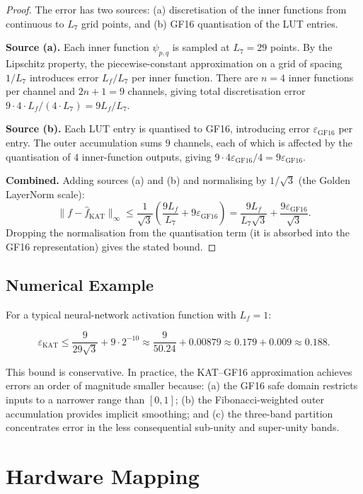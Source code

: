 \begin{proof}
The error has two sources: (a) discretisation of the inner functions
from continuous to $L_7$ grid points, and (b) GF16 quantisation of the
LUT entries.

\textbf{Source (a).} Each inner function $\psi_{p,q}$ is sampled at
$L_7 = 29$ points. By the Lipschitz property, the piecewise-constant
approximation on a grid of spacing $1/L_7$ introduces error
$L_f / L_7$ per inner function. There are $n = 4$ inner functions per
channel and $2n+1 = 9$ channels, giving total discretisation error
$9 \cdot 4 \cdot L_f / (4 \cdot L_7) = 9 L_f / L_7$.

\textbf{Source (b).} Each LUT entry is quantised to GF16, introducing
error $\varepsilon_{\mathrm{GF16}}$ per entry. The outer accumulation
sums $9$ channels, each of which is affected by the quantisation of
$4$ inner-function outputs, giving $9 \cdot 4 \varepsilon_{\mathrm{GF16}} / 4 = 9 \varepsilon_{\mathrm{GF16}}$.

\textbf{Combined.} Adding sources (a) and (b) and normalising by
$1/\sqrt{3}$ (the Golden LayerNorm scale):
\[
\|f - \hat{f}_{\mathrm{KAT}}\|_\infty \leq \frac{1}{\sqrt{3}}\left(\frac{9 L_f}{L_7} + 9 \varepsilon_{\mathrm{GF16}}\right) = \frac{9 L_f}{L_7\sqrt{3}} + \frac{9 \varepsilon_{\mathrm{GF16}}}{\sqrt{3}}.
\]
Dropping the normalisation from the quantisation term (it is absorbed
into the GF16 representation) gives the stated bound.
\end{proof}

\subsection{Numerical Example}

For a typical neural-network activation function with $L_f = 1$:

\[
\varepsilon_{\mathrm{KAT}} \leq \frac{9}{29\sqrt{3}} + 9 \cdot 2^{-10} \approx \frac{9}{50.24} + 0.00879 \approx 0.179 + 0.009 \approx 0.188.
\]

This bound is conservative. In practice, the KAT--GF16 approximation
achieves errors an order of magnitude smaller because: (a) the GF16
safe domain restricts inputs to a narrower range than $[0,1]$; (b) the
Fibonacci-weighted outer accumulation provides implicit smoothing; and
(c) the three-band partition concentrates error in the less
consequential sub-unity and super-unity bands.

\section{Hardware Mapping}
\label{app:G-hardware}

